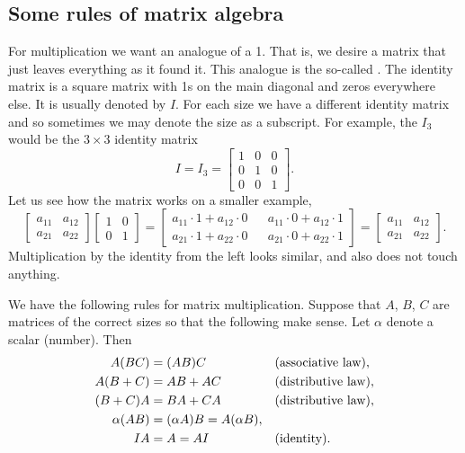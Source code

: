 \subsection{Some rules of matrix algebra}

For multiplication we want an analogue of a 1.  That is,
we desire a matrix that just leaves everything as it found it.
This analogue is the
so-called \emph{}.
The identity matrix is a square matrix with 1s on the
main diagonal and zeros everywhere else.  It is usually denoted by $I$.
For each size we have a different identity matrix and so sometimes we may denote
the size as a subscript.  For example, the $I_3$ would be the $3 \times 3$
identity matrix
\begin{equation*}
I = I_3 =
\begin{bmatrix}
1 & 0 & 0 \\
0 & 1 & 0 \\
0 & 0 & 1
\end{bmatrix} .
\end{equation*}
Let us see how the matrix works on a smaller example,
\begin{equation*}
\begin{bmatrix}
a_{11} & a_{12} \\
a_{21} & a_{22} 
\end{bmatrix}
\begin{bmatrix}
1 & 0 \\
0 & 1
\end{bmatrix} =
\begin{bmatrix}
a_{11} \cdot 1 + a_{12} \cdot 0
& &
a_{11} \cdot 0 + a_{12} \cdot 1
\\
a_{21} \cdot 1 + a_{22} \cdot 0
& &
a_{21} \cdot 0 + a_{22} \cdot 1
\end{bmatrix}
=
\begin{bmatrix}
a_{11} & a_{12} \\
a_{21} & a_{22} 
\end{bmatrix} .
\end{equation*}
Multiplication by the identity from the left looks similar, and also
does not touch anything.

\medskip

We have the following rules for matrix multiplication.  Suppose that
$A$, $B$, $C$ are matrices of the correct sizes so that the following
make sense.  Let $\alpha$ denote a scalar (number).  Then
\begin{align*}
A(BC) & = (AB)C & & \text{(\myindex{associative law})} , \\
A(B+C) & = AB + AC & & \text{(\myindex{distributive law})} , \\
(B+C)A & = BA + CA & & \text{(distributive law)} , \\
\alpha(AB) & = (\alpha A)B = A(\alpha B) , & &  \\
IA & = A = AI & & \text{(identity)}.
\end{align*}

